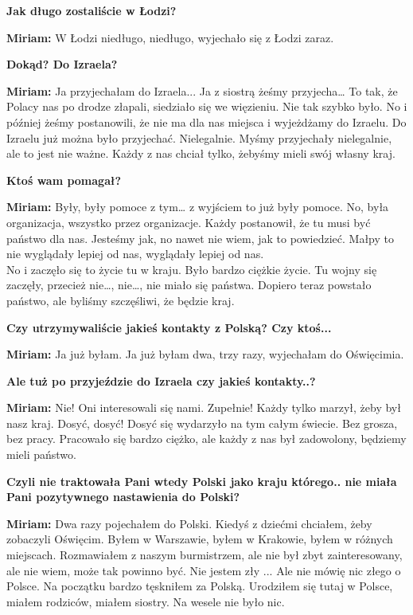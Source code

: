 \textbf{Jak długo zostaliście w Łodzi?} 

\textbf{Miriam:} W Łodzi niedługo, niedługo, wyjechało się z Łodzi zaraz. 

\textbf{Dokąd? Do Izraela?} 

\textbf{Miriam:} Ja przyjechałam do Izraela... Ja z siostrą żeśmy przyjecha… To tak, że Polacy nas po drodze złapali, siedziało się we więzieniu. Nie tak szybko było. No i później żeśmy postanowili, że nie ma dla nas miejsca i wyjeżdżamy do Izraelu. Do Izraelu już można było przyjechać. Nielegalnie. Myśmy przyjechały nielegalnie, ale to jest nie ważne. Każdy z nas chciał tylko, żebyśmy mieli swój własny kraj. 

\textbf{Ktoś wam pomagał?} 

\textbf{Miriam:} Były, były pomoce z tym… z wyjściem to już były pomoce. No, była organizacja, wszystko przez organizacje. Każdy postanowił, że tu musi być państwo dla nas. Jesteśmy jak, no nawet nie wiem, jak to powiedzieć. Małpy to nie wyglądały lepiej od nas, wyglądały lepiej od nas. \\
No i zaczęło się to życie tu w kraju. Było bardzo ciężkie życie. Tu wojny się zaczęły, przecież nie…, nie…, nie miało się państwa. Dopiero teraz powstało państwo, ale byliśmy szczęśliwi, że będzie kraj. 

\textbf{Czy utrzymywaliście jakieś kontakty z Polską? Czy ktoś...} 

\textbf{Miriam:} Ja już byłam. Ja już byłam dwa, trzy razy, wyjechałam do Oświęcimia. 

\textbf{Ale tuż po przyjeździe do Izraela czy jakieś kontakty..?}

\textbf{Miriam:} Nie! Oni interesowali się nami. Zupełnie! Każdy tylko marzył, żeby był nasz kraj. Dosyć, dosyć! Dosyć się wydarzyło na tym całym świecie. Bez grosza, bez pracy. Pracowało się bardzo ciężko, ale każdy z nas był zadowolony, będziemy mieli państwo. 

\textbf{Czyli nie traktowała Pani wtedy Polski jako kraju którego.. nie miała Pani pozytywnego nastawienia do Polski?} 

\textbf{Miriam:} Dwa razy pojechałem do Polski. Kiedyś z dziećmi chciałem, żeby zobaczyli Oświęcim. Byłem w Warszawie, byłem w Krakowie, byłem w różnych miejscach. Rozmawiałem z naszym burmistrzem, ale nie był zbyt zainteresowany, ale nie wiem, może tak powinno być. Nie jestem zły ... Ale nie mówię nic złego o Polsce. Na początku bardzo tęskniłem za Polską. Urodziłem się tutaj w Polsce, miałem rodziców, miałem siostry. Na wesele nie było nic.


